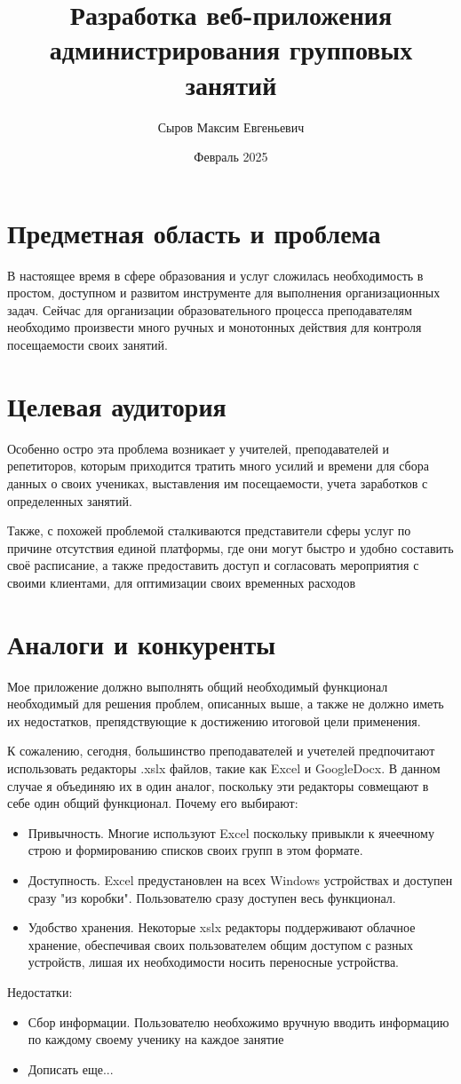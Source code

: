 \documentclass[14pt, timesnewroman]{article}
\title{Разработка веб-приложения администрирования групповых занятий}
\author{Сыров Максим Евгеньевич}
\date{Февраль 2025}
\begin{document}
\maketitle 
\section{Предметная область и проблема}

В настоящее время в сфере образования и услуг сложилась необходимость в простом, доступном и развитом инструменте для выполнения организационных задач. Сейчас для организации образовательного процесса преподавателям необходимо произвести много ручных и монотонных действия для контроля посещаемости своих занятий.
\section{Целевая аудитория}
Особенно остро эта проблема возникает у учителей, преподавателей и репетиторов, которым приходится тратить много усилий и времени для сбора данных о своих учениках, выставления им посещаемости, учета заработков с определенных занятий.

Также, с похожей проблемой сталкиваются представители сферы услуг по причине отсутствия единой платформы, где они могут быстро и удобно составить своё расписание, а также предоставить доступ и согласовать мероприятия с своими клиентами, для оптимизации своих временных расходов

\section{Аналоги и конкуренты}
Мое приложение должно выполнять общий необходимый функционал необходимый для решения проблем, описанных выше, а также  не должно иметь их недостатков, препядствующие к достижению итоговой цели применения.

К сожалению, сегодня, большинство преподавателей и учетелей предпочитают использовать редакторы .xslx файлов, такие как Excel и GoogleDocx. В данном случае я объединяю их в один аналог, поскольку эти редакторы совмещают в себе один общий функционал.
Почему его выбирают:
\begin{itemize}
    \item Привычность. Многие используют Excel поскольку привыкли к ячеечному строю и формированию списков своих групп в этом формате.
    \item Доступность. Excel предустановлен на всех Windows устройствах и доступен сразу "из коробки". Пользователю сразу доступен весь функционал.
    \item Удобство хранения. Некоторые xslx редакторы поддерживают облачное хранение, обеспечивая своих пользователем общим доступом с разных устройств, лишая их необходимости носить переносные устройства.
\end{itemize}
Недостатки:
\begin{itemize}
    \item Сбор информации. Пользователю необхожимо вручную вводить информацию по каждому своему ученику на каждое занятие
    \item Дописать еще...
\end{itemize}
\end{document}
